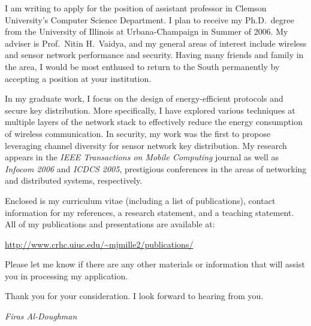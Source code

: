 \documentclass[10pt,a4paper,ragged2e]{altacv}
\begin{document}
\begin{newlfm}\large

I am writing to apply for the position of assistant
professor in Clemson University's Computer Science Department.  I plan to receive my
Ph.D.\ degree from the University of Illinois at
Urbana-Champaign in Summer of 2006.  My adviser is
Prof.\ Nitin H.\ Vaidya, and my general areas of interest
include wireless and sensor network performance and security.
 Having many friends and family in the area, I would be
most enthused to return to the South permanently by accepting
a position at your institution.
\vspace{0.4cm}

In my graduate work, I focus on the design of
energy-efficient protocols and secure key distribution.
More specifically, I have explored various techniques at
multiple layers of the network stack to effectively reduce
the energy consumption of wireless communication.  In security,
my work was the first to propose leveraging channel diversity
for sensor network key distribution.  My research appears in 
the \textit{IEEE Transactions on Mobile Computing} journal as
well as \textit{Infocom 2006} and \textit{ICDCS 2005},
prestigious conferences in the areas of networking and distributed
systems, respectively.

\vspace{0.4cm}

Enclosed is my curriculum vitae (including a list of
publications), contact information for my references, a research
statement, and a teaching statement.  All of my publications and
presentations are available at:

\url{http://www.crhc.uiuc.edu/~mjmille2/publications/}

Please let me know if there are any other materials
or information that will assist you in processing my application.

\vspace{0.4cm}

Thank you for your consideration.  I look forward to
hearing from you.

\end{newlfm}
\vspace{1cm}

\hspace{13 cm}
\large
{}
\vspace{1cm}

\Large
\hspace{13 cm}\textit{{Firas Al-Doughman}}

\clearpage


% 
% 
\end{document}
